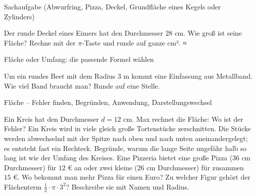 \begin{aufgabe}{Sachaufgabe (Abwurfring, Pizza, Deckel, Grundfläche eines Kegels oder Zylinders)}
\begin{teile}
\teil Der runde Deckel eines Eimers hat den Durchmesser $28$ cm. Wie groß ist seine Fläche? Rechne mit der $\pi$-Taste und runde auf ganze cm². ≈ \leerfeld[cm²]
\end{teile}
\end{aufgabe}

\begin{aufgabe}{Fläche oder Umfang: die passende Formel wählen}
\begin{teile}
\teil Um ein rundes Beet mit dem Radius $3$ m kommt eine Einfassung aus Metallband. Wie viel Band braucht man? Runde auf eine Stelle. \leerfeld
\end{teile}
\end{aufgabe}

\begin{aufgabe}{Fläche – Fehler finden, Begründen, Anwendung, Darstellungswechsel}
\begin{teile}
\teil Ein Kreis hat den Durchmesser $d = 12$ cm. Max rechnet die Fläche:  Wo ist der Fehler?
\teil Ein Kreis wird in viele gleich große Tortenstücke zerschnitten. Die Stücke werden abwechselnd mit der Spitze nach oben und nach unten aneinandergelegt; es entsteht fast ein Rechteck. Begründe, warum die lange Seite ungefähr halb so lang ist wie der Umfang des Kreises.
\teil Eine Pizzeria bietet eine große Pizza ($36$ cm Durchmesser) für $12$ € an oder zwei kleine ($26$ cm Durchmesser) für zusammen $15$ €. Wo bekommt man mehr Pizza für einen Euro?
\teil Zu welcher Figur gehört der Flächenterm $\frac{1}{2} \cdot \pi \cdot 3^2$? Beschreibe sie mit Namen und Radius.
\end{teile}
\end{aufgabe}
